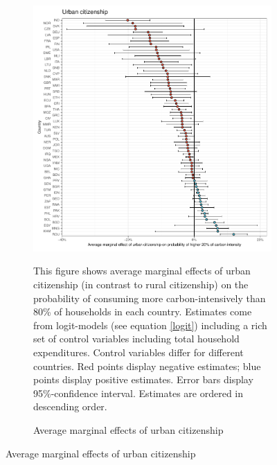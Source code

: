\begin{figure}[ht!]\ContinuedFloat
   \centering
   \begin{subfigure}[b]{\textwidth}
   \centering
   \includegraphics{1_Figures/Analysis_Logit_Models_Marginal_Effects/Average_Marginal_Effects_affected_upper_80_urban_01_2017B.pdf}
   \caption{Average marginal effects of urban citizenship} \label{fig:Logit_ME_urban}
   \begin{subcaption2}
     This figure shows average marginal effects of urban citizenship (in contrast to rural citizenship) on the probability of consuming more carbon-intensively than 80\% of households in each country. Estimates come from logit-models (see equation \ref{logit}) including a rich set of control variables including total household expenditures. Control variables differ for different countries. Red points display negative estimates; blue points display positive estimates. Error bars display 95\%-confidence interval. Estimates are ordered in descending order.
   \end{subcaption2}
   \end{subfigure}
 \end{figure}
 \clearpage

